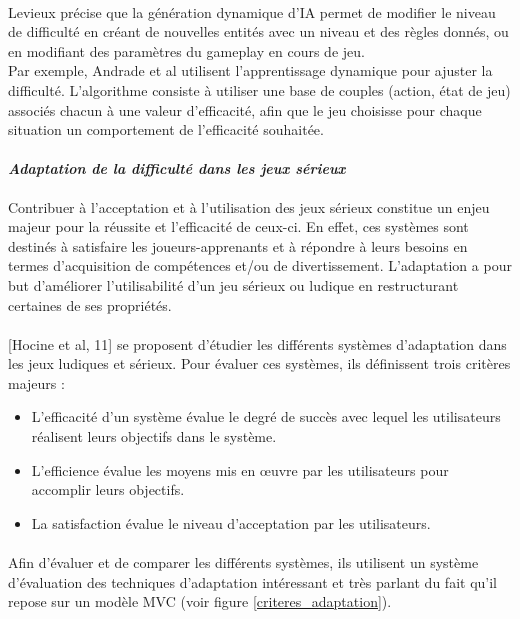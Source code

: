 \paragraph{}
Levieux précise que la génération dynamique d’IA permet de modifier le niveau de difficulté en créant de nouvelles entités avec un niveau et des règles donnés, ou en modifiant des paramètres du gameplay en cours de jeu.\\
Par exemple, Andrade et al utilisent l’apprentissage dynamique pour ajuster la difficulté. L’algorithme consiste à utiliser une base de couples (action, état de jeu) associés chacun à une valeur d’efficacité, afin que le jeu choisisse pour chaque situation un comportement de l’efficacité souhaitée.

		\paragraph{\emph{Adaptation de la difficulté dans les jeux sérieux} \\ \quad}
Contribuer à l'acceptation et à l'utilisation des jeux sérieux constitue un enjeu majeur pour la réussite et l'efficacité de ceux-ci. En effet, ces systèmes sont destinés à satisfaire les joueurs-apprenants et à répondre à leurs besoins en termes d'acquisition de compétences et/ou de divertissement. L’adaptation a pour but d’améliorer l’utilisabilité d’un jeu sérieux ou ludique en restructurant certaines de ses propriétés.

\paragraph{}
[Hocine et al, 11] se proposent d'étudier les différents systèmes d'adaptation dans les jeux ludiques et sérieux. Pour évaluer ces systèmes, ils définissent trois critères majeurs :
\begin{itemize}
	\item L’efficacité d’un système évalue le degré de succès avec lequel les utilisateurs réalisent leurs objectifs dans le système.
	\item L’efficience évalue les moyens mis en œuvre par les utilisateurs pour accomplir leurs objectifs.
	\item La satisfaction évalue le niveau d’acceptation par les utilisateurs.
\end{itemize}

\paragraph{}
Afin d'évaluer et de comparer les différents systèmes, ils utilisent un système d'évaluation des techniques d'adaptation intéressant et très parlant du fait qu'il repose sur un modèle MVC (voir figure \ref{criteres_adaptation}).

